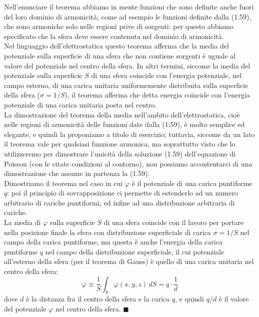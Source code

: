Nell'enunciare il teorema abbiamo in mente funzioni che sono definite anche fuori del loro dominio di armonicità, come ad esempio le funzioni definite dalla (1.59), che sono armoniche solo nelle regioni prive di sorgenti: per questo abbiamo specificato che la
sfera deve essere contenuta nel dominio di armonicità.\\
Nel linguaggio dell'elettrostatica questo teorema afferma che la media del potenziale sulla superficie di una sfera che non contiene sorgenti è uguale al valore del potenziale nel centro della sfera. In altri termini, siccome la media del potenziale sulla superficie $S$ di una sfera coincide con l'energia potenziale, nel campo esterno, di una carica unitaria uniformemente distribuita sulla superficie della sfera ($\sigma=1/S$), il teorema afferma che detta energia coincide con l'energia potenziale di una carica unitaria posta nel centro.\\
La dimostrazione del teorema della media nell'ambito dell'elettrostatica, cioè nelle regioni di armonicità delle funzioni date dalla (1.59), è molto semplice ed elegante, e quindi la proponiamo a titolo di esercizio; tuttavia, siccome da un lato il teorema vale per qualsiasi funzione armonica, ma soprattutto visto che lo utilizzeremo per dimostrare l'unicità della soluzione (1.59) dell'equazione di Poisson (con le citate condizioni al contorno), non possiamo accontentarci di una dimostrazione che assume in partenza la (1.59).\\
Dimostriamo il teorema nel caso in cui $\varphi$ è il potenziale di una carica puntiforme $q$: poi il principio di sovrapposizione ci permette di estenderlo ad un numero arbitrario di cariche puntiformi, ed infine ad una distribuzione arbitraria di cariche.\\
La media di $\varphi$ sulla superficie $S$ di una sfera coincide con il lavoro per portare nella posizione finale la sfera con distribuzione superficiale di carica $\sigma=1/S$ nel campo della carica puntiforme, ma questa è anche l'energia della carica puntiforme $q$ nel campo della distribuzione superficiale, il cui potenziale all'esterno della sfera (per il teorema di Gauss) è quello di una carica unitaria nel centro della sfera:
\begin{equation}
\overline\varphi\equiv\frac1S\int_S\varphi(x,y,z)\,dS=q\cdot\frac1d
\tag{1.100}
\end{equation}
dove $d$ è la distanza fra il centro della sfera e la carica $q$, e quindi $q/d$ è il valore del potenziale $\varphi$ nel centro della sfera. $\blacksquare$

